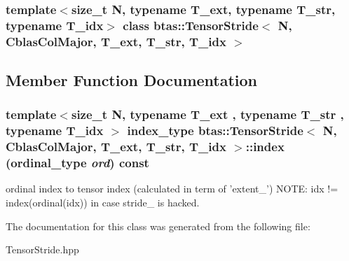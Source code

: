 \subsubsection*{template$<$size\_\-t N, typename T\_\-ext, typename T\_\-str, typename T\_\-idx$>$ class btas::TensorStride$<$ N, CblasColMajor, T\_\-ext, T\_\-str, T\_\-idx $>$}



\subsection{Member Function Documentation}
\hypertarget{classbtas_1_1_tensor_stride_3_01_n_00_01_cblas_col_major_00_01_t__ext_00_01_t__str_00_01_t__idx_01_4_ab8527a50a7a91639e8e5a9c3564f7c53}{
\subsubsection[{index}]{\setlength{\rightskip}{0pt plus 5cm}template$<$size\_\-t N, typename T\_\-ext , typename T\_\-str , typename T\_\-idx $>$ index\_\-type btas::TensorStride$<$ N, CblasColMajor, T\_\-ext, T\_\-str, T\_\-idx $>$::index (ordinal\_\-type {\em ord}) const}}
\label{classbtas_1_1_tensor_stride_3_01_n_00_01_cblas_col_major_00_01_t__ext_00_01_t__str_00_01_t__idx_01_4_ab8527a50a7a91639e8e5a9c3564f7c53}
ordinal index to tensor index (calculated in term of 'extent\_\-') NOTE: idx != index(ordinal(idx)) in case stride\_\- is hacked. 

The documentation for this class was generated from the following file:\begin{DoxyCompactItemize}
\item 
TensorStride.hpp\end{DoxyCompactItemize}
